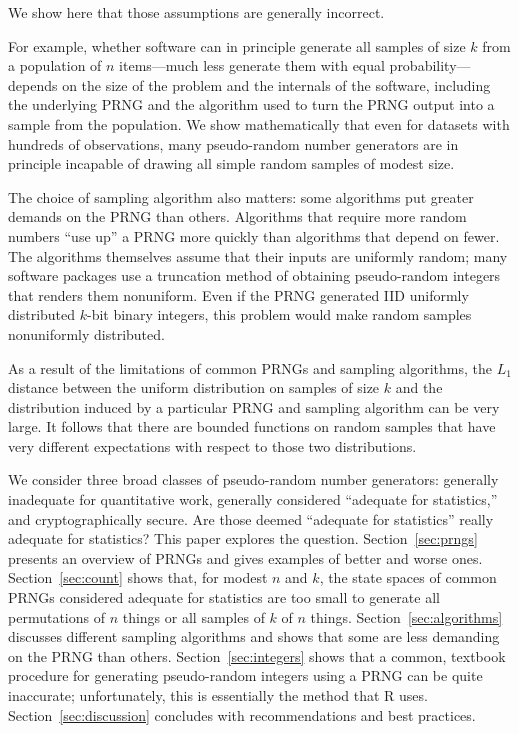 \documentclass[graybox]{svmult}
\begin{document}
We show here that those assumptions are generally incorrect.

For example, whether software can in principle generate all samples of size $k$ from a population of
$n$ items---much less generate them with equal probability---depends on the size of the problem and the internals of the software, including the underlying PRNG and the
algorithm used to turn the PRNG output into a sample from the population.
We show mathematically that even for datasets with hundreds of observations, 
many pseudo-random number generators
are in principle incapable of drawing all simple random samples of modest size.

The choice of sampling algorithm also matters:
some algorithms put greater demands on the PRNG than others.
Algorithms that require more random numbers ``use up'' a PRNG more quickly than algorithms that depend on fewer.
The algorithms themselves assume that their inputs are uniformly random;
many software packages use a truncation method of obtaining pseudo-random integers that renders them nonuniform.
Even if the PRNG generated IID uniformly distributed $k$-bit binary integers, this problem would 
make random samples nonuniformly distributed.

As a result of the limitations of common PRNGs and sampling algorithms,
the $L_1$ distance between the uniform distribution on samples of
size $k$ and the distribution induced by a particular PRNG and sampling algorithm can be very large.
It follows that there are bounded functions on random samples that have very different expectations with respect to those two distributions.

We consider three broad classes of pseudo-random number generators: generally inadequate for quantitative work, generally considered ``adequate for statistics,'' and cryptographically secure.
Are those deemed ``adequate for statistics'' really adequate for statistics?
This paper explores the question.
Section~\ref{sec:prngs} presents an overview of PRNGs and gives examples of better and worse ones.
Section~\ref{sec:count} shows that, for modest $n$ and $k$, the state spaces of common PRNGs considered adequate for statistics are too small to generate all permutations of $n$ things or all samples of $k$ of $n$ things. 
Section~\ref{sec:algorithms} discusses different sampling algorithms and shows that some are less demanding on the PRNG than others. 
Section~\ref{sec:integers} shows that a common, textbook procedure for generating pseudo-random integers using a PRNG can be quite inaccurate; unfortunately, this is essentially the method that R uses.
Section~\ref{sec:discussion} concludes with recommendations and best practices.
\end{document}
